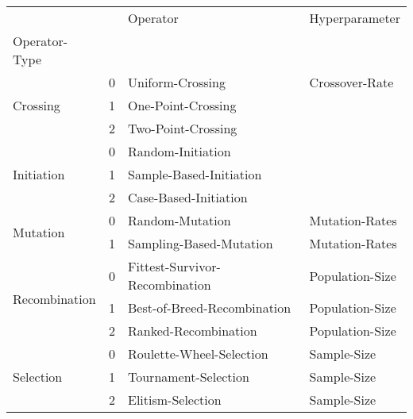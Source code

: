\begin{tabular}{llll}
\toprule
 &  & Operator & Hyperparameter \\
Operator-Type &  &  &  \\
\midrule
\multirow[t]{3}{*}{Crossing} & 0 & Uniform-Crossing & Crossover-Rate \\
 & 1 & One-Point-Crossing &  \\
 & 2 & Two-Point-Crossing &  \\
\cline{1-4}
\multirow[t]{3}{*}{Initiation} & 0 & Random-Initiation &  \\
 & 1 & Sample-Based-Initiation &  \\
 & 2 & Case-Based-Initiation &  \\
\cline{1-4}
\multirow[t]{2}{*}{Mutation} & 0 & Random-Mutation & Mutation-Rates \\
 & 1 & Sampling-Based-Mutation & Mutation-Rates \\
\cline{1-4}
\multirow[t]{3}{*}{Recombination} & 0 & Fittest-Survivor-Recombination & Population-Size \\
 & 1 & Best-of-Breed-Recombination & Population-Size \\
 & 2 & Ranked-Recombination & Population-Size \\
\cline{1-4}
\multirow[t]{3}{*}{Selection} & 0 & Roulette-Wheel-Selection & Sample-Size \\
 & 1 & Tournament-Selection & Sample-Size \\
 & 2 & Elitism-Selection & Sample-Size \\
\cline{1-4}
\bottomrule
\end{tabular}
